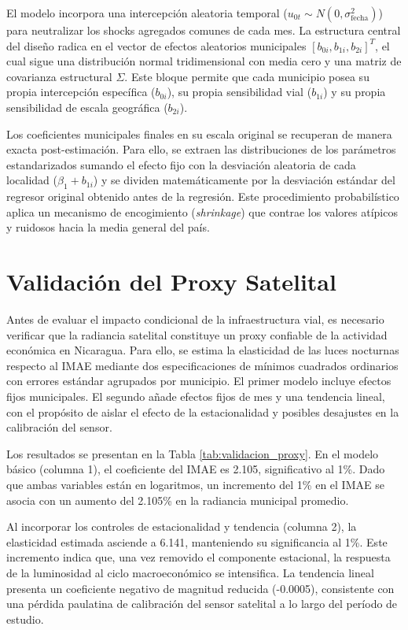 \documentclass[
  spanish,
  12pt,
  letterpaper]{article}
\begin{document}
El modelo incorpora una intercepción aleatoria temporal
(\(u_{0t} \sim N(0, \sigma^2_{\text{fecha}})\)) para neutralizar los
shocks agregados comunes de cada mes. La estructura central del diseño
radica en el vector de efectos aleatorios municipales
\([b_{0i}, b_{1i}, b_{2i}]^T\), el cual sigue una distribución normal
tridimensional con media cero y una matriz de covarianza estructural
\(\Sigma\). Este bloque permite que cada municipio posea su propia
intercepción específica (\(b_{0i}\)), su propia sensibilidad vial
(\(b_{1i}\)) y su propia sensibilidad de escala geográfica (\(b_{2i}\)).

Los coeficientes municipales finales en su escala original se recuperan
de manera exacta post-estimación. Para ello, se extraen las
distribuciones de los parámetros estandarizados sumando el efecto fijo
con la desviación aleatoria de cada localidad (\({\beta_1 + b_{1i}}\)) y
se dividen matemáticamente por la desviación estándar del regresor
original obtenido antes de la regresión. Este procedimiento
probabilístico aplica un mecanismo de encogimiento (\emph{shrinkage})
que contrae los valores atípicos y ruidosos hacia la media general del
país.

\section{Validación del Proxy Satelital}\label{sec-validacion_proxy}

Antes de evaluar el impacto condicional de la infraestructura vial, es
necesario verificar que la radiancia satelital constituye un proxy
confiable de la actividad económica en Nicaragua. Para ello, se estima
la elasticidad de las luces nocturnas respecto al IMAE mediante dos
especificaciones de mínimos cuadrados ordinarios con errores estándar
agrupados por municipio. El primer modelo incluye efectos fijos
municipales. El segundo añade efectos fijos de mes y una tendencia
lineal, con el propósito de aislar el efecto de la estacionalidad y
posibles desajustes en la calibración del sensor.

Los resultados se presentan en la Tabla \ref{tab:validacion_proxy}. En
el modelo básico (columna 1), el coeficiente del IMAE es 2.105,
significativo al 1\%. Dado que ambas variables están en logaritmos, un
incremento del 1\% en el IMAE se asocia con un aumento del 2.105\% en la
radiancia municipal promedio.

Al incorporar los controles de estacionalidad y tendencia (columna 2),
la elasticidad estimada asciende a 6.141, manteniendo su significancia
al 1\%. Este incremento indica que, una vez removido el componente
estacional, la respuesta de la luminosidad al ciclo macroeconómico se
intensifica. La tendencia lineal presenta un coeficiente negativo de
magnitud reducida (-0.0005), consistente con una pérdida paulatina de
calibración del sensor satelital a lo largo del período de estudio.
\end{document}
